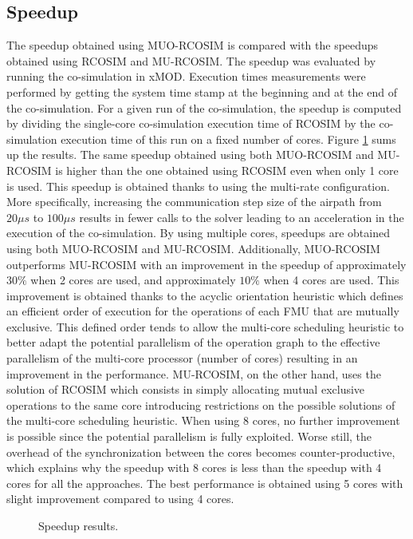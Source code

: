 \subsection{Speedup}

The speedup obtained using MUO-RCOSIM is compared with the speedups obtained using RCOSIM and MU-RCOSIM. The speedup was evaluated by running the co-simulation in xMOD. Execution times measurements were performed by getting the system time stamp at the beginning and at the end of the co-simulation. For a given run of the co-simulation, the speedup is computed by dividing the single-core co-simulation execution time of RCOSIM by the co-simulation execution time of this run on a fixed number of cores. Figure \ref{fig:spdup} sums up the results. The same speedup obtained using both MUO-RCOSIM and MU-RCOSIM is higher than the one obtained using RCOSIM even when only 1 core is used. This speedup is obtained thanks to using the multi-rate configuration. More specifically, increasing the communication step size of the airpath from $20 {\mu}s$ to $100 {\mu}s$ results in fewer calls to the solver leading to an acceleration in the execution of the co-simulation. By using multiple cores, speedups are obtained using both MUO-RCOSIM and MU-RCOSIM. Additionally, MUO-RCOSIM outperforms MU-RCOSIM with an improvement in the speedup of approximately $30\%$ when 2 cores are used, and approximately $10\%$ when 4 cores are used. This improvement is obtained thanks to the acyclic orientation heuristic which defines an efficient order of execution for the operations of each FMU that are mutually exclusive. This defined order tends to allow the multi-core scheduling heuristic to better adapt the potential parallelism of the operation graph to the effective parallelism of the multi-core processor (number of cores) resulting in an improvement in the performance. MU-RCOSIM, on the other hand, uses the solution of RCOSIM which consists in simply allocating mutual exclusive operations to the same core introducing restrictions on the possible solutions of the multi-core scheduling heuristic. When using 8 cores, no further improvement is possible since the potential parallelism is fully exploited. Worse still, the overhead of the synchronization between the cores becomes counter-productive, which explains why the speedup with 8 cores is less than the speedup with 4 cores for all the approaches. The best performance is obtained using 5 cores with slight improvement compared to using 4 cores. 

\begin{figure}[phbt]
\centering

\caption{Speedup results.}
\label{fig:spdup}
\end{figure}  

